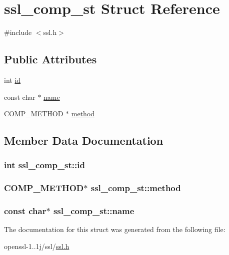 \hypertarget{structssl__comp__st}{\section{ssl\-\_\-comp\-\_\-st Struct Reference}
\label{structssl__comp__st}
}


{\ttfamily \#include $<$ssl.\-h$>$}

\subsection*{Public Attributes}
\begin{DoxyCompactItemize}
\item 
int \hyperlink{structssl__comp__st_aa0289c534fa9807fd873d0586c5e49aa}{id}
\item 
const char $\ast$ \hyperlink{structssl__comp__st_a5f5f77d06eefedaaa25bab3779a37c7b}{name}
\item 
C\-O\-M\-P\-\_\-\-M\-E\-T\-H\-O\-D $\ast$ \hyperlink{structssl__comp__st_a0db9c4890962ace222be72135c08b26c}{method}
\end{DoxyCompactItemize}


\subsection{Member Data Documentation}
\hypertarget{structssl__comp__st_aa0289c534fa9807fd873d0586c5e49aa}{
\subsubsection[{id}]{\setlength{\rightskip}{0pt plus 5cm}int ssl\-\_\-comp\-\_\-st\-::id}}\label{structssl__comp__st_aa0289c534fa9807fd873d0586c5e49aa}
\hypertarget{structssl__comp__st_a0db9c4890962ace222be72135c08b26c}{
\subsubsection[{method}]{\setlength{\rightskip}{0pt plus 5cm}C\-O\-M\-P\-\_\-\-M\-E\-T\-H\-O\-D$\ast$ ssl\-\_\-comp\-\_\-st\-::method}}\label{structssl__comp__st_a0db9c4890962ace222be72135c08b26c}
\hypertarget{structssl__comp__st_a5f5f77d06eefedaaa25bab3779a37c7b}{
\subsubsection[{name}]{\setlength{\rightskip}{0pt plus 5cm}const char$\ast$ ssl\-\_\-comp\-\_\-st\-::name}}\label{structssl__comp__st_a5f5f77d06eefedaaa25bab3779a37c7b}


The documentation for this struct was generated from the following file\-:\begin{DoxyCompactItemize}
\item 
openssl-\/1..\-1j/ssl/\hyperlink{ssl_8h}{ssl.\-h}\end{DoxyCompactItemize}
